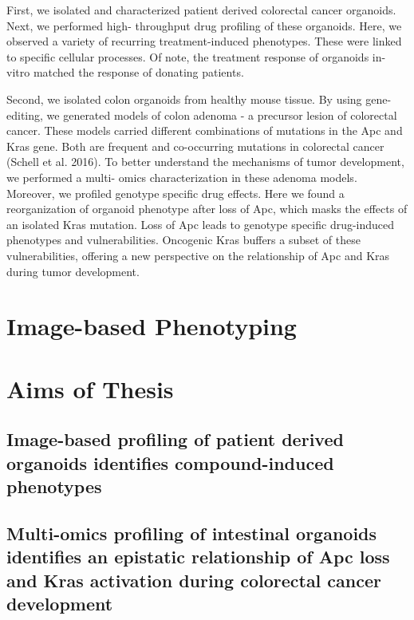 First, we isolated and characterized patient derived colorectal cancer organoids. Next, we performed high- throughput drug profiling of these organoids. Here, we observed a variety of recurring treatment-induced phenotypes. These were linked to specific cellular processes. Of note, the treatment response of organoids in-vitro matched the response of donating patients.

Second, we isolated colon organoids from healthy mouse tissue. By using gene-editing, we generated models of colon adenoma - a precursor lesion of colorectal cancer. These models carried different combinations of mutations in the Apc and Kras gene. Both are frequent and co-occurring mutations in colorectal cancer (Schell et al. 2016). To better understand the mechanisms of tumor development, we performed a multi- omics characterization in these adenoma models. Moreover, we profiled genotype specific drug effects. Here we found a reorganization of organoid phenotype after loss of Apc, which masks the effects of an isolated Kras mutation. Loss of Apc leads to genotype specific drug-induced phenotypes and vulnerabilities. Oncogenic Kras buffers a subset of these vulnerabilities, offering a new perspective on the relationship of Apc and Kras during tumor development.

\section{Image-based Phenotyping}
\section{Aims of Thesis}
\subsection{Image-based profiling of patient derived organoids identifies compound-induced phenotypes}
\subsection{Multi-omics profiling of intestinal organoids identifies an epistatic relationship of Apc loss and Kras activation during colorectal cancer development}

